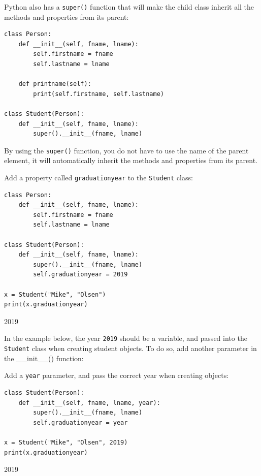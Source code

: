 \documentclass[12pt,a4paper]{article}
\newcommand{\code}[1]{%
	\colorbox{backcolour}{\lstinline{#1}}%
}
\newcommand{\lcode}[1]{%
	\lstinline{#1}%
}
\begin{document}
Python also has a \code{super()} function that will make the child class
inherit all the methods and properties from its parent:

\begin{ebox}
	\begin{lstlisting}
class Person:
    def __init__(self, fname, lname):
        self.firstname = fname
        self.lastname = lname

    def printname(self):
        print(self.firstname, self.lastname)

class Student(Person):
    def __init__(self, fname, lname):
        super().__init__(fname, lname)
	\end{lstlisting}
\end{ebox}

By using the \code{super()} function, you do not have to use the name of the
parent element, it will automatically inherit the methods and properties from
its parent.

\begin{ebox}
	Add a property called \lcode{graduationyear} to the \lcode{Student} class:
	\begin{lstlisting}
class Person:
    def __init__(self, fname, lname):
        self.firstname = fname
        self.lastname = lname

class Student(Person):
    def __init__(self, fname, lname):
        super().__init__(fname, lname)
        self.graduationyear = 2019

x = Student("Mike", "Olsen")
print(x.graduationyear)
	\end{lstlisting}
\tcblower
	\begin{vercode}
2019
	\end{vercode}
\end{ebox}

In the example below, the year \code{2019} should be a variable, and passed
into the \code{Student} class when creating student objects. To do so, add
another parameter in the \_\_init\_\_() function:

\begin{ebox}
Add a \lcode{year} parameter, and pass the correct year when creating objects:
	\begin{lstlisting}
class Student(Person):
    def __init__(self, fname, lname, year):
        super().__init__(fname, lname)
        self.graduationyear = year

x = Student("Mike", "Olsen", 2019)
print(x.graduationyear)
	\end{lstlisting}
\tcblower
	\begin{vercode}
2019
	\end{vercode}
\end{ebox}
\end{document}
